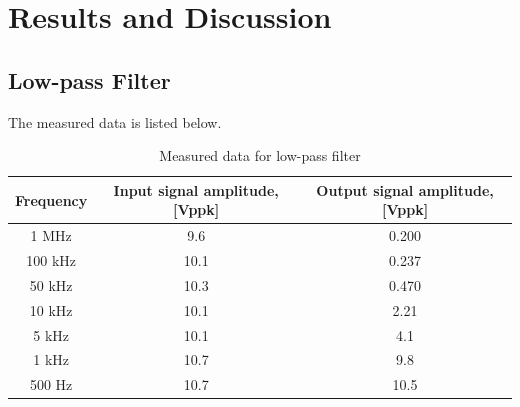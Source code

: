 \documentclass{article}
\begin{document}
\section{Results and Discussion}
\subsection{Low-pass Filter}
The measured data is listed below.
\begin{table}[H]
\centering
\begin{tabular}{|c|c|c|}
\hline
Frequency & Input signal amplitude, {[}Vppk{]} & Output signal amplitude, {[}Vppk{]} \\ \hline
1 MHz     & 9.6                                & 0.200                               \\ \hline
100 kHz   & 10.1                               & 0.237                               \\ \hline
50 kHz    & 10.3                               & 0.470                               \\ \hline
10 kHz    & 10.1                               & 2.21                                \\ \hline
5 kHz     & 10.1                               & 4.1                                 \\ \hline
1 kHz     & 10.7                               & 9.8                                 \\ \hline
500 Hz    & 10.7                               & 10.5                                \\ \hline
\end{tabular}
\caption{Measured data for low-pass filter}
\end{table}
\end{document}
